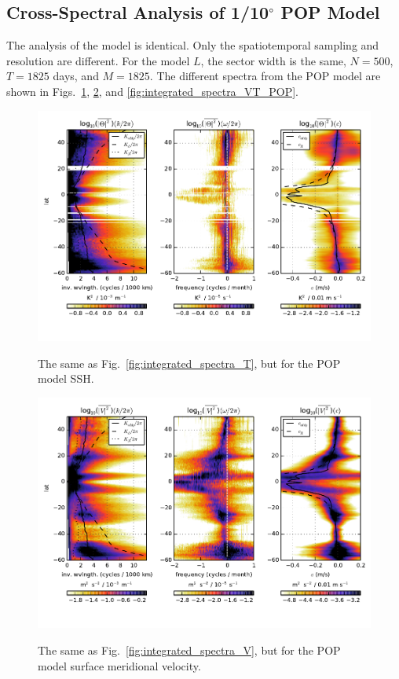 \documentclass[10pt]{article}
\begin{document}
\subsection{Cross-Spectral Analysis of 1/10$^\circ$ POP Model}

The analysis of the model is identical. Only the spatiotemporal sampling and resolution are different. For the model $L$, the sector width is the same, $N = 500$, $T=1825$ days, and $M=1825$. The different spectra from the POP model are shown in Figs.~\ref{fig:integrated_spectra_T_POP}, \ref{fig:integrated_spectra_V_POP}, and \ref{fig:integrated_spectra_VT_POP}.

\begin{figure}[t]
  \noindent\includegraphics{../figures/POP_50degwide/integrated_spectra_T.pdf}\\
  \caption{The same as Fig.~\ref{fig:integrated_spectra_T}, but for the POP model SSH.}
  \label{fig:integrated_spectra_T_POP}
\end{figure}

\begin{figure}[t]
  \noindent\includegraphics{../figures/POP_50degwide/integrated_spectra_V.pdf}\\
  \caption{The same as Fig.~\ref{fig:integrated_spectra_V}, but for the POP model surface meridional velocity.}
  \label{fig:integrated_spectra_V_POP}
\end{figure}
\end{document}
